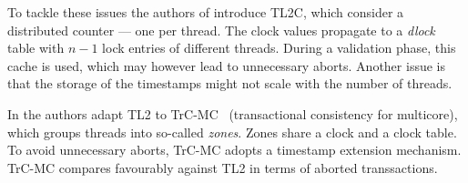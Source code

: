 To tackle these issues the authors of \cite{Avni:2008} introduce TL2C, which consider a distributed counter --- one per thread. 
The clock values propagate to a \emph{dlock} table with $n-1$ lock entries of different threads. 
During a validation phase, this cache is used, which may however lead to unnecessary aborts. 
Another issue is that the storage of the timestamps might not scale with the number of threads.

In \cite{6121290} the authors adapt TL2 to TrC-MC~\cite{chan2011trc} (transactional consistency for multicore), which groups threads into so-called \textit{zones}. 
Zones share a clock and a clock table. 
To avoid unnecessary aborts, TrC-MC adopts a timestamp extension mechanism.
TrC-MC compares favourably against TL2 in terms of aborted transsactions.  




%


